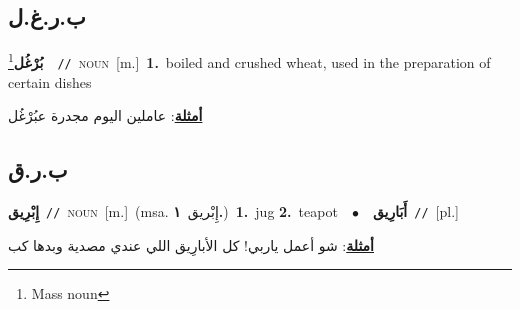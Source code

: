 \documentclass[10pt,a4paper,twoside]{article} %
\begin{document}
\begin{multicols}{2}
\vspace{-3mm}
\subsection*{\color{blue}\foreignlanguage{arabic}{ب.ر.غ.ل}\color{blue}{}} 

{\setlength\topsep{0pt}\textbf{\foreignlanguage{arabic}{بُرْغُل}}\footnote{Mass noun}\ \ {\color{gray}\texttt{//}\color{black}}\ \textsc{noun}\ [m.]\ \textbf{1.}~boiled and crushed wheat, used in the preparation of certain dishes\  \begin{flushright}\color{gray}\foreignlanguage{arabic}{\textbf{\underline{\foreignlanguage{arabic}{أمثلة}}}: عاملين اليوم مجدرة عبُرْغُل}\end{flushright}\color{black}} \vspace{2mm}

\vspace{-3mm}
\subsection*{\color{blue}\foreignlanguage{arabic}{ب.ر.ق}\color{blue}{}} 

{\setlength\topsep{0pt}\textbf{\foreignlanguage{arabic}{إِبْرِيق}}\ {\color{gray}\texttt{//}\color{black}}\ \textsc{noun}\ [m.]\ \color{gray}(msa. \foreignlanguage{arabic}{إِبْريق}~\foreignlanguage{arabic}{\textbf{١.}})\color{black}\ \textbf{1.}~jug  \textbf{2.}~teapot\ \ $\bullet$\ \ \setlength\topsep{0pt}\textbf{\foreignlanguage{arabic}{أَبَارِيق}}\ {\color{gray}\texttt{//}\color{black}}\ [pl.]\  \begin{flushright}\color{gray}\foreignlanguage{arabic}{\textbf{\underline{\foreignlanguage{arabic}{أمثلة}}}: شو أعمل ياربي! كل الأبارِيق اللي عندي مصدية وبدها كب}\end{flushright}\color{black}} \vspace{2mm}


\end{multicols}
\end{document}
